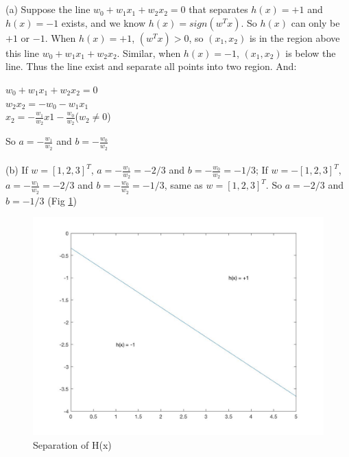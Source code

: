 \documentclass[12pt]{article}
\begin{document}
 \\\\
\indent (a) Suppose the line $w_0 + w_1x_1 + w_2x_2 = 0$ that separates $h(x) = +1$ and $h(x) = -1$ exists, and we know $h(x) = sign(w^Tx)$. So $h(x)$ can only be $+1$ or $-1$. When $h(x) = +1$, $(w^Tx) > 0$, so $(x_1,x_2)$ is in the region above this line $w_0 + w_1x_1 + w_2x_2$. Similar, when $h(x) = -1$, $(x_1,x_2)$ is below the line. Thus the line exist and separate all points into two region. And: 
\begin{center}$w_0 + w_1x_1 + w_2x_2 = 0$\\$w_2x_2 = -w_0 - w_1x_1$\\$x_2 = -\frac{w_1}{w_2}x1 - \frac{w_0}{w_2}$($w_2 \neq 0$)
\end{center}
So $a = -\frac{w_1}{w_2}$ and $b = - \frac{w_0}{w_2}$\\\\
\indent (b) If $w = [1,2,3]^T$, $a = -\frac{w_1}{w_2} = -2/3$ and $b = - \frac{w_0}{w_2} = -1/3$; If $w = - [1,2,3]^T$, $a = -\frac{w_1}{w_2} = -2/3$ and $b = - \frac{w_0}{w_2} = -1/3$, same as $w = [1,2,3]^T$. So $a = -2/3$ and $b = -1/3$ (Fig \ref {fig:Pic1})
\begin{figure}[H]
  \centering
  \includegraphics[scale = 0.25]{Pic1.jpg}
  \caption{Separation of H(x)}
  \label{fig:Pic1}
\end{figure}
\end{document}
